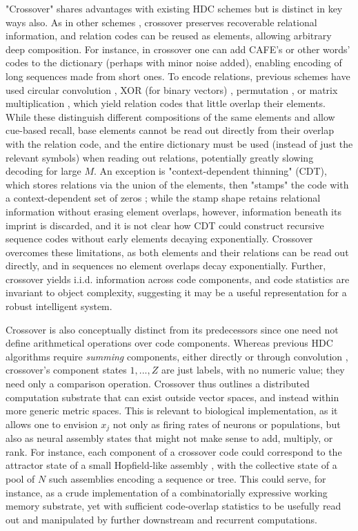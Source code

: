\documentclass{article}
\begin{document}
"Crossover" shares advantages with existing HDC schemes but is distinct in key ways also. As in other schemes \cite{Kanerva:2009}, crossover preserves recoverable relational information, and relation codes can be reused as elements, allowing arbitrary deep composition. For instance, in crossover one can add CAFE's or other words' codes to the dictionary (perhaps with minor noise added), enabling encoding of long sequences made from short ones. To encode relations, previous schemes have used circular convolution \cite{Plate:1995}, XOR (for binary vectors) \cite{Kanerva:1994}, permutation \cite{Sahlgren:2008, Gayler:1998}, or matrix multiplication \cite{Gosmann:2019}, which yield relation codes that little overlap their elements. While these distinguish different compositions of the same elements and allow cue-based recall, base elements cannot be read out directly from their overlap with the relation code, and the entire dictionary must be used (instead of just the relevant symbols) when reading out relations, potentially greatly slowing decoding for large $M$. An exception is "context-dependent thinning" (CDT), which stores relations via the union of the elements, then "stamps" the code with a context-dependent set of zeros \cite{Rachkovskij:2001}; while the stamp shape retains relational information without erasing element overlaps, however, information beneath its imprint is discarded, and it is not clear how CDT could construct recursive sequence codes without early elements decaying exponentially. Crossover overcomes these limitations, as both elements and their relations can be read out directly, and in sequences no element overlaps decay exponentially. Further, crossover yields i.i.d. information across code components, and code statistics are invariant to object complexity, suggesting it may be a useful representation for a robust intelligent system.

Crossover is also conceptually distinct from its predecessors since one need not define arithmetical operations over code components. Whereas previous HDC algorithms require \textit{summing} components, either directly or through convolution \cite{Plate:1995, Gayler:1998, Sahlgren:2008, Gosmann:2019, Rachkovskij:2001, Kanerva:1994}, crossover's component states $1, ..., Z$ are just labels, with no numeric value; they need only a comparison operation. Crossover thus outlines a distributed computation substrate that can exist outside vector spaces, and instead within more generic metric spaces. This is relevant to biological implementation, as it allows one to envision $x_j$ not only as firing rates of neurons or populations, but also as neural assembly states that might not make sense to add, multiply, or rank. For instance, each component of a crossover code could correspond to the attractor state of a small Hopfield-like assembly \cite{Hopfield:1982}, with the collective state of a pool of $N$ such assemblies encoding a sequence or tree. This could serve, for instance, as a crude implementation of a combinatorially expressive working memory substrate, yet with sufficient code-overlap statistics to be usefully read out and manipulated by further downstream and recurrent computations.
\end{document}
